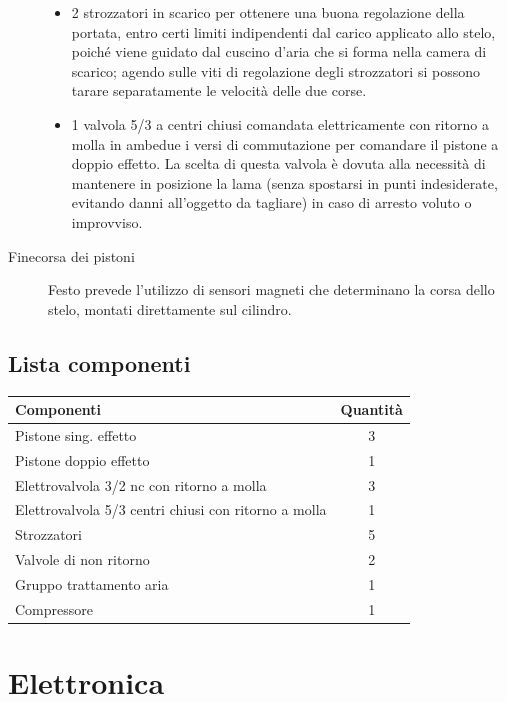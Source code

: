 \documentclass{report}
\begin{document}
\begin{description}
\begin{itemize}
  \item 2 strozzatori in scarico per ottenere una buona regolazione della portata, entro certi limiti indipendenti dal carico applicato allo stelo, poiché viene guidato dal cuscino d’aria che si forma nella camera di scarico; agendo sulle viti di regolazione degli strozzatori si possono tarare separatamente le velocità delle due corse.
  \item 1 valvola 5/3 a centri chiusi comandata elettricamente con ritorno a molla in ambedue i versi di commutazione per comandare il pistone a doppio effetto. La scelta di questa valvola è dovuta alla necessità di mantenere in posizione la lama (senza spostarsi in punti indesiderate, evitando danni all’oggetto da tagliare) in caso di arresto voluto o improvviso.
  \end{itemize}

\item[Finecorsa dei pistoni] Festo prevede l’utilizzo di sensori magneti che determinano la corsa dello stelo, montati direttamente sul cilindro.
\end{description}

\subsection{Lista componenti}
\begin{table}[H]
\centering
\begin{tabular}{|l|c|}
  \hline
  {\textbf{Componenti}} & \textbf{Quantità} \\ \hline
  Pistone sing. effetto & 3 \\ \hline
  Pistone doppio effetto & 1 \\ \hline
  Elettrovalvola 3/2 nc con ritorno a molla & 3 \\ \hline
  Elettrovalvola 5/3 centri chiusi con ritorno a molla & 1 \\ \hline
  Strozzatori & 5 \\ \hline
  Valvole di non ritorno & 2 \\ \hline
  Gruppo trattamento aria & 1 \\ \hline
  Compressore & 1 \\ \hline
\end{tabular}
\end{table}

\section{Elettronica}
\end{document}
